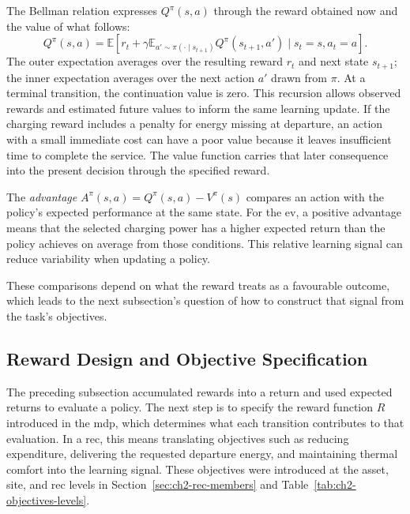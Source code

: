 The Bellman relation expresses $Q^\pi(s,a)$ through the reward obtained now and the value of what follows:
\begin{equation}
Q^\pi(s,a)=\mathbb E\!\left[r_t+\gamma
\mathbb E_{a'\sim\pi(\cdot\mid s_{t+1})}Q^\pi(s_{t+1},a')
\mid s_t=s,a_t=a\right].
\label{eq:ch2-bellman}
\end{equation}
The outer expectation averages over the resulting reward $r_t$ and next state $s_{t+1}$; the inner expectation averages over the next action $a'$ drawn from $\pi$. At a terminal transition, the continuation value is zero. This recursion allows observed rewards and estimated future values to inform the same learning update. If the charging reward includes a penalty for energy missing at departure, an action with a small immediate cost can have a poor value because it leaves insufficient time to complete the service. The value function carries that later consequence into the present decision through the specified reward.

The \emph{advantage} $A^\pi(s,a)=Q^\pi(s,a)-V^\pi(s)$ compares an action with the policy's expected performance at the same state. For the \gls{ev}, a positive advantage means that the selected charging power has a higher expected return than the policy achieves on average from those conditions. This relative learning signal can reduce variability when updating a policy.

These comparisons depend on what the reward treats as a favourable outcome, which leads to the next subsection's question of how to construct that signal from the task's objectives.

\subsection{Reward Design and Objective Specification}
\label{sec:ch2-reward}

The preceding subsection accumulated rewards into a return and used expected returns to evaluate a policy. The next step is to specify the reward function $R$ introduced in the \gls{mdp}, which determines what each transition contributes to that evaluation. In a \gls{rec}, this means translating objectives such as reducing expenditure, delivering the requested departure energy, and maintaining thermal comfort into the learning signal. These objectives were introduced at the asset, site, and \gls{rec} levels in Section~\ref{sec:ch2-rec-members} and Table~\ref{tab:ch2-objectives-levels}.

